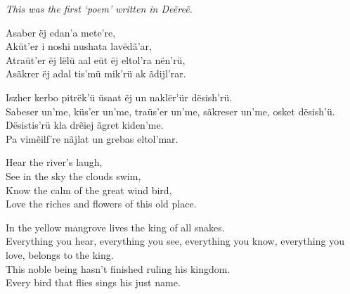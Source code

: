 \label{samp:theKingOfAllSnakes}
\emph{This was the first ‘poem’ written in Deẽreẽ.}

Asaber ëj edan’a mete’re,\\
Aküt’er i noshi nushata lavëdã’ar,\\
Atraüt’er ëj lëlü aal eüt ëj eltol’ra nën’rü,\\
Asãkrer ëj adal tis’mü mik’rü ak ãdijl’rar.

Iszher kerbo pitrëk’ü üsaat ëj un naklër’ür dësish’rü.\\
Sabeser un’me, küs’er un’me, traüs’er un’me, sãkreser un’me, osket dësish’ü.\\
Dësistis’rü kla drẽiej ãgret kiden’me.\\
Pa vimẽilf’re nãjlat un grebas eltol’mar.

Hear the river’s laugh,\\
See in the sky the clouds swim,\\
Know the calm of the great wind bird,\\
Love the riches and flowers of this old place.

In the yellow mangrove lives the king of all snakes.\\
Everything you hear, everything you see, everything you know, everything you love, belongs to the king.\\
This noble being hasn’t finished ruling his kingdom.\\
Every bird that flies sings his just name.

